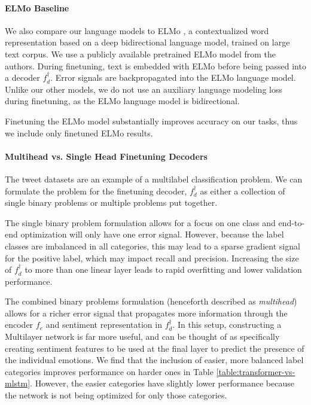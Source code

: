 \documentclass[letterpaper]{article} \usepackage{aaai19}  \usepackage{times}  \usepackage{helvet}  \usepackage{courier}  \usepackage{url}  \usepackage{graphicx}  \usepackage{booktabs}
\begin{document}
\paragraph{ELMo Baseline}
We also compare our language models to ELMo \protect\cite{ELMo}, a contextualized word representation based on a deep bidirectional language model, trained on large text corpus. We use a publicly available pretrained ELMo model from the authors. During finetuning, text is embedded with ELMo before being passed into a decoder $f_d^{\dagger}$. Error signals are backpropagated into the ELMo language model. Unlike our other models, we do not use an auxiliary language modeling loss during finetuning, as the ELMo language model is bidirectional.

Finetuning the ELMo model substantially improves accuracy on our tasks, thus we include only finetuned ELMo results. 

\paragraph{Multihead vs. Single Head Finetuning Decoders}
The tweet datasets are an example of a multilabel classification problem. We can formulate the problem for the finetuning decoder, $f_d^{\dagger}$ as either a collection of single binary problems or multiple problems put together. 

The single binary problem formulation allows for a focus on one class and end-to-end optimization will only have one error signal. However, because the label classes are imbalanced in all categories, this may lead to a sparse gradient signal for the positive label, which may impact recall and precision. Increasing the size of $f_d^{\dagger}$ to more than one linear layer leads to rapid overfitting and lower validation performance.

The combined binary problems formulation (henceforth described as \textit{multihead}) allows for a richer error signal that propagates more information through the encoder $f_e$ and sentiment representation in $f^{\dagger}_d$. In this setup, constructing a Multilayer network is far more useful, and can be thought of as specifically creating sentiment features to be used at the final layer to predict the presence of the individual emotions. We find that the inclusion of easier, more balanced label categories improves performance on harder ones in Table \ref{table:transformer-vs-mlstm}. However, the easier categories have slightly lower performance because the network is not being optimized for only those categories. 
\end{document}
